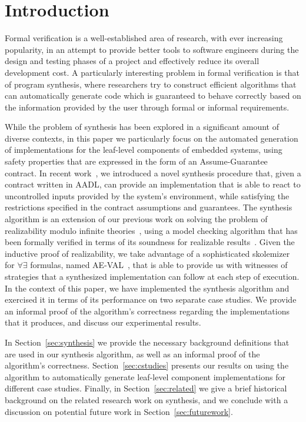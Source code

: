 \section{Introduction}
Formal verification is a well-established area of research, with ever increasing
popularity, in an attempt to provide better tools to software engineers during
the design and testing phases of a project and effectively reduce its overall
development cost. A particularly interesting problem in formal verification is
that of program synthesis, where researchers try to construct efficient algorithms that can
automatically generate code which is guaranteed to behave correctly based on the
information provided by the user through formal or informal requirements.

While the problem of synthesis has been explored in a significant amount of
diverse contexts, in this paper we particularly focus on the automated
generation of implementations for the leaf-level components of embedded
systems, using safety properties that are expressed in the form of an
Assume-Guarantee contract.
In recent work~\cite{katis2016towards}, we introduced a novel synthesis
procedure that, given a contract written in AADL, can provide an implementation
that is able to react to uncontrolled inputs provided by the system's
environment, while satisfying the restrictions specified in the contract
assumptions and guarantees. The synthesis algorithm
is an extension of our previous work on solving the problem of
realizability modulo infinite theories~\cite{Katis15:Realizability}, using a
model checking algorithm that has been formally verified in terms of its soundness for realizable
results~\cite{Katis:machine}. Given the inductive proof of realizability, we
take advantage of a sophisticated skolemizer for $\forall\exists$ formulas,
named AE-VAL~\cite{fedyukovich2015automated}, that is able to provide us with
witnesses of strategies that a synthesized implementation can follow at each
step of execution. In the context of this paper, we have implemented the synthesis 
algorithm and exercised it in terms of its performance on two separate case studies. We
provide an informal proof of the algorithm's correctness regarding the
implementations that it produces, and discuss our experimental results.

In Section~\ref{sec:synthesis} we provide the necessary background
definitions that are used in our synthesis algorithm, as well as an informal
proof of the algorithm's correctness. Section~\ref{sec:cstudies} presents our
results on using the algorithm to automatically generate leaf-level component
implementations for different case studies. Finally, in
Section~\ref{sec:related} we give a brief historical background on the related
research work on synthesis, and we conclude with a discussion on potential
future work in Section~\ref{sec:futurework}.
